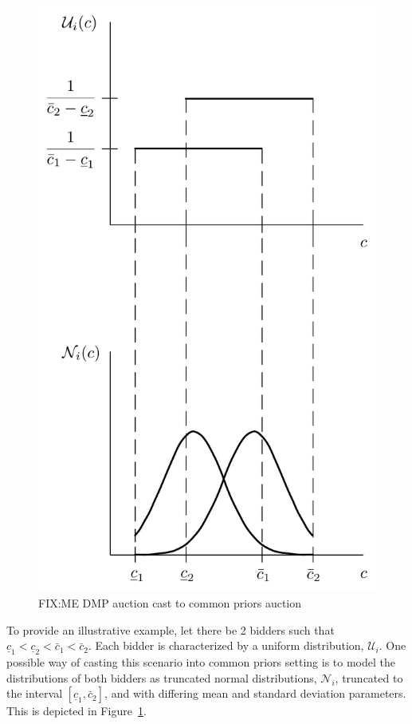 \begin{figure}[t]
  \includegraphics[width=\figsize]{Approximation/Figures/dmp_to_common_priors}
  \caption{FIX:ME DMP auction cast to common priors auction}
  \label{fig:dmp_to_common_priors_approximation}
\end{figure}

To provide an illustrative example, let there be 2 bidders such that $\underline{c}_1 < \underline{c}_2 < \bar{c}_1 < \bar{c}_2$. Each bidder is characterized by a uniform distribution, $\mathcal{U}_i$. One possible way of casting this scenario into common priors setting is to model the distributions of both bidders as truncated normal distributions, $\mathcal{N}_i$, truncated to the interval $[\underline{c}_1, \bar{c}_2]$, and with differing mean and standard deviation parameters. This is depicted in Figure~\ref{fig:dmp_to_common_priors_approximation}.


